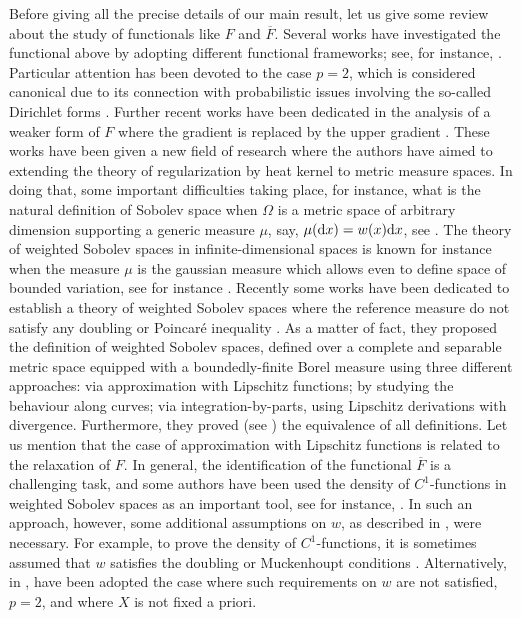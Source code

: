 \documentclass[11pt,leqno]{amsart}
\theoremstyle{remark}
\theoremstyle{definition}
\theoremstyle{definition}
\def\de{{\rm d}}
\begin{document}
Before giving all the precise details of our main result, let us give some review about the study of functionals like $F$ and $\overline{F}$.
Several works have investigated the functional above by adopting different functional frameworks; see, for instance, \cite{CD,CCMH1,CCMH2,CC,FM,Ha,Ma}. Particular attention has been devoted to the case $p=2$, which is considered canonical due to its connection with probabilistic issues involving the so-called Dirichlet forms \cite{ALB,RO}. Further recent works have been dedicated in the analysis of a weaker form of $F$ where the gradient is replaced by the upper gradient \cite{LAMB2,LAMB3,LAMB1}. These works have been given a new field of research where the authors have aimed to extending the theory of regularization by heat kernel to metric measure spaces. In doing that, some important difficulties taking place, for instance, what is the natural definition of Sobolev space when $\Omega$ is a metric space of arbitrary dimension supporting a generic measure $\mu$, say,  $\mu(\de x)=w(x)\de x$, see \cite{HKST}. The theory of weighted Sobolev spaces in infinite-dimensional spaces is known for instance when the measure $\mu$ is the gaussian measure which allows even to define space of bounded variation, see for instance \cite{Caselles}. 
Recently some works have been dedicated to establish a theory of weighted Sobolev spaces where the reference measure  do not satisfy any doubling or Poincaré inequality \cite{LAMB0}. As a matter of fact, they proposed the definition of weighted Sobolev spaces, defined over a complete and separable metric space equipped with a boundedly-finite Borel measure using  three different approaches: via approximation with Lipschitz functions; by studying the behaviour along curves; via integration-by-parts, using Lipschitz derivations with divergence. Furthermore, they proved (see \cite[Theorem 7.1]{LAMB0}) the equivalence of all definitions. Let us mention that the case of approximation with Lipschitz functions is related to the relaxation of $F$.
In general, the identification of the functional ${\overline F}$ is a challenging task, and some authors have been used the density of $C^{1}$-functions in weighted Sobolev spaces as an important tool, see for instance, \cite{CPSC,CC}.  In  such an approach, however, some additional assumptions on $w$, as  described in \cite{CPSC}, were necessary. For example, to prove the density of $C^{1}$-functions, it is sometimes assumed that $w$ satisfies the doubling or Muckenhoupt conditions \cite{HKST,Muk}. Alternatively, in \cite{CC}, have been adopted the case where such requirements on $w$ are not satisfied, $p=2$, and where $X$ is not fixed a priori. 
\end{document}
